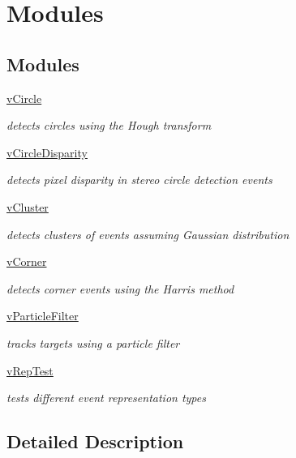\hypertarget{group__Modules}{}\section{Modules}
\label{group__Modules}
\subsection*{Modules}
\begin{DoxyCompactItemize}
\item 
\hyperlink{group__vCircle}{v\+Circle}
\begin{DoxyCompactList}\small\item\em detects circles using the Hough transform \end{DoxyCompactList}\item 
\hyperlink{group__vCircleDisparity}{v\+Circle\+Disparity}
\begin{DoxyCompactList}\small\item\em detects pixel disparity in stereo circle detection events \end{DoxyCompactList}\item 
\hyperlink{group__vCluster}{v\+Cluster}
\begin{DoxyCompactList}\small\item\em detects clusters of events assuming Gaussian distribution \end{DoxyCompactList}\item 
\hyperlink{group__vCorner}{v\+Corner}
\begin{DoxyCompactList}\small\item\em detects corner events using the Harris method \end{DoxyCompactList}\item 
\hyperlink{group__vParticleFilter}{v\+Particle\+Filter}
\begin{DoxyCompactList}\small\item\em tracks targets using a particle filter \end{DoxyCompactList}\item 
\hyperlink{group__vRepTest}{v\+Rep\+Test}
\begin{DoxyCompactList}\small\item\em tests different event representation types \end{DoxyCompactList}\end{DoxyCompactItemize}


\subsection{Detailed Description}

